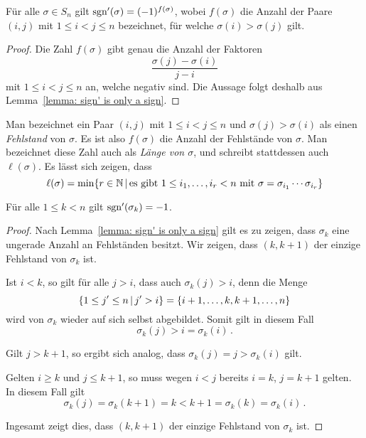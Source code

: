 \begin{corollary}
  Für alle $\sigma \in S_n$ gilt $\operatorname{sgn}'(\sigma) = (-1)^{f(\sigma)}$, wobei $f(\sigma)$ die Anzahl der Paare $(i,j)$ mit $1 \leq i < j \leq n$ bezeichnet, für welche $\sigma(i) > \sigma(j)$ gilt.
\end{corollary}

\begin{proof}
  Die Zahl $f(\sigma)$ gibt genau die Anzahl der Faktoren
  \[
    \frac{\sigma(j) - \sigma(i)}{j - i}
  \]
  mit $1 \leq i < j \leq n$ an, welche negativ sind.
  Die Aussage folgt deshalb aus Lemma~\ref{lemma: sign' is only a sign}.
\end{proof}

\begin{remark}
  Man bezeichnet ein Paar $(i,j)$ mit $1 \leq i < j \leq n$ und $\sigma(j) > \sigma(i)$ als einen \emph{Fehlstand} von $\sigma$.
  Es ist also $f(\sigma)$ die Anzahl der Fehlstände von $\sigma$.
  Man bezeichnet diese Zahl auch als \emph{Länge von $\sigma$}, und schreibt stattdessen auch $\ell(\sigma)$.
  Es lässt sich zeigen, dass
  \[
      \ell(\sigma)
    = \min
      \{
        r \in \Natural
      \suchthat
        \text{es gibt $1 \leq i_1, \dotsc, i_r < n$ mit $\sigma = \sigma_{i_1} \dotsm \sigma_{i_r}$}
      \}
  \]
\end{remark}

\begin{lemma}
\label{lemma: sign' of simple transposition}
  Für alle $1 \leq k < n$ gilt $\operatorname{sgn}'(\sigma_k) = -1$.
\end{lemma}

\begin{proof}
  Nach Lemma~\ref{lemma: sign' is only a sign} gilt es zu zeigen, dass $\sigma_k$ eine ungerade Anzahl an Fehlständen besitzt.
  Wir zeigen, dass $(k,k+1)$ der einzige Fehlstand von $\sigma_k$ ist.
  
  Ist $i < k$, so gilt für alle $j > i$, dass auch $\sigma_k(j) > i$, denn die Menge
  \[
      \{
        1 \leq j' \leq n
        \suchthat
        j' > i
      \}
    = \{i+1, \dotsc, k, k+1, \dotsc, n\}
  \]
  wird von $\sigma_k$ wieder auf sich selbst abgebildet.
  Somit gilt in diesem Fall
  \[
      \sigma_k(j)
    > i
    = \sigma_k(i) \,.
  \]
  
  Gilt $j > k+1$, so ergibt sich analog, dass $\sigma_k(j) = j > \sigma_k(i)$ gilt.
  
  Gelten $i \geq k$ und $j \leq k+1$, so muss wegen $i < j$ bereits $i = k$, $j = k+1$ gelten.
  In diesem Fall gilt
  \[
      \sigma_k(j)
    = \sigma_k(k+1)
    = k
    < k+1
    = \sigma_k(k)
    = \sigma_k(i) \,.
  \]
  
  Ingesamt zeigt dies, dass $(k,k+1)$ der einzige Fehlstand von $\sigma_k$ ist.
\end{proof}



